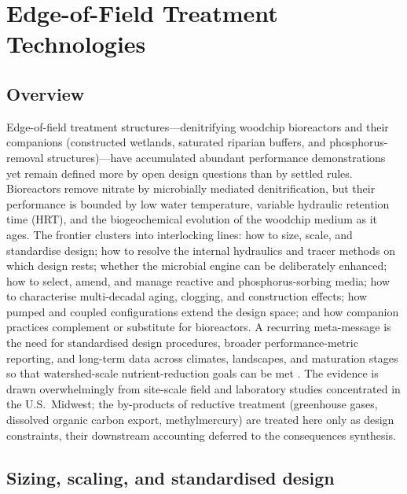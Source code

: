 \documentclass[11pt]{article}
\begin{document}
\section*{Edge-of-Field Treatment Technologies}

\subsection{Overview}

Edge-of-field treatment structures---denitrifying woodchip bioreactors and
their companions (constructed wetlands, saturated riparian buffers, and
phosphorus-removal structures)---have accumulated abundant performance
demonstrations yet remain defined more by open design questions than by settled
rules. Bioreactors remove nitrate by microbially mediated denitrification, but
their performance is bounded by low water temperature, variable hydraulic
retention time (HRT), and the biogeochemical evolution of the woodchip medium as
it ages. The frontier clusters into interlocking lines: how to size, scale, and
standardise design; how to resolve the internal hydraulics and tracer methods on
which design rests; whether the microbial engine can be deliberately enhanced;
how to select, amend, and manage reactive and phosphorus-sorbing media; how to
characterise multi-decadal aging, clogging, and construction effects; how
pumped and coupled configurations extend the design space; and how companion
practices complement or substitute for bioreactors. A recurring meta-message is
the need for standardised design procedures, broader performance-metric
reporting, and long-term data across climates, landscapes, and maturation stages
so that watershed-scale nutrient-reduction goals can be met
\parencite{Christianson2021,Maxwell2022,Bell2015}. The evidence is drawn
overwhelmingly from site-scale field and laboratory studies concentrated in the
U.S.\ Midwest; the by-products of reductive treatment (greenhouse gases,
dissolved organic carbon export, methylmercury) are treated here only as design
constraints, their downstream accounting deferred to the consequences synthesis.

\subsection{Sizing, scaling, and standardised design}
\end{document}
